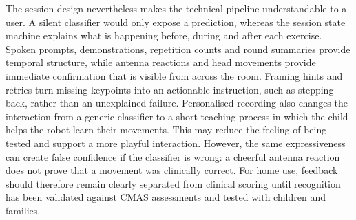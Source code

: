 The session design nevertheless makes the technical pipeline understandable to a user. A silent classifier would only expose a prediction, whereas the session state machine explains what is happening before, during and after each exercise. Spoken prompts, demonstrations, repetition counts and round summaries provide temporal structure, while antenna reactions and head movements provide immediate confirmation that is visible from across the room. Framing hints and retries turn missing keypoints into an actionable instruction, such as stepping back, rather than an unexplained failure. Personalised recording also changes the interaction from a generic classifier to a short teaching process in which the child helps the robot learn their movements. This may reduce the feeling of being tested and support a more playful interaction. However, the same expressiveness can create false confidence if the classifier is wrong: a cheerful antenna reaction does not prove that a movement was clinically correct. For home use, feedback should therefore remain clearly separated from clinical scoring until recognition has been validated against CMAS assessments and tested with children and families.

\newpage